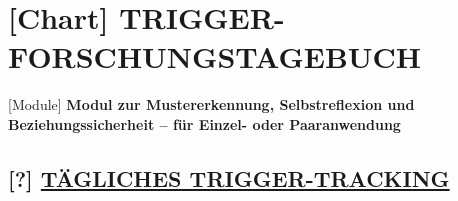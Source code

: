 \hypertarget{trigger-forschungstagebuch}{%
\section{\texorpdfstring{[Chart] \textbf{TRIGGER-FORSCHUNGSTAGEBUCH} }{[Chart] TRIGGER-FORSCHUNGSTAGEBUCH }}\label{trigger-forschungstagebuch}}

[Module] \textbf{Modul zur Mustererkennung, Selbstreflexion und Beziehungssicherheit -- für Einzel- oder Paaranwendung}

\hypertarget{tuxe4gliches-trigger-tracking}{%
\subsection{\texorpdfstring{[?] \textbf{\ul{TÄGLICHES TRIGGER-TRACKING}}}{[?] TÄGLICHES TRIGGER-TRACKING}}\label{tuxe4gliches-trigger-tracking}}

